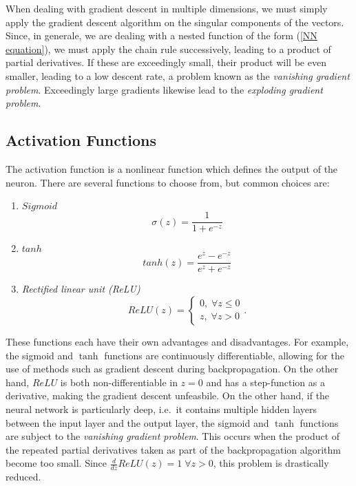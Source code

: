 \documentclass[10pt,a4paper]{book}
\begin{document}
When dealing with gradient descent in multiple dimensions, we must simply apply the gradient descent algorithm on the singular components of the vectors. Since, in generale, we are dealing with a nested function of the form (\ref{NN equation}), we must apply the chain rule successively, leading to a product of partial derivatives. If these are exceedingly small, their product will be even smaller, leading to a low descent rate, a problem known as the \emph{vanishing gradient problem}. Exceedingly large gradients likewise lead to the \emph{exploding gradient problem}. 

\subsection{Activation Functions}
The activation function is a nonlinear function which defines the output of the neuron. There are several functions to choose from, but common choices are:
\begin{enumerate}
\item $Sigmoid$
\begin{equation*}
\sigma(z) = \frac{1}{1 + e^{-z}}
\end{equation*}
\item $tanh$
\begin{equation*}
tanh(z) = \frac{e^z - e^{-z}}{e^z + e^{-z}}
\end{equation*}
\item \emph{Rectified linear unit (ReLU)}
\begin{equation*}
ReLU(z) = \begin{cases}
0, \; \forall z \leq 0 \\
z, \; \forall z > 0
\end{cases}.
\end{equation*}
\end{enumerate} 
These functions each have their own advantages and disadvantages. For example, the sigmoid and $\tanh$ functions are continuously differentiable, allowing for the use of methods such as gradient descent during backpropagation. On the other hand, $ReLU$ is both non-differentiable in $z = 0$ and has a step-function as a derivative, making the gradient descent unfeasbile. On the other hand, if the neural network is particularly deep, i.e.\ it contains multiple hidden layers between the input layer and the output layer, the sigmoid and $\tanh$ functions are subject to the \emph{vanishing gradient problem}. This occurs when the product of the repeated partial derivatives taken as part of the backpropagation algorithm become too small. Since $\frac{d}{dz}ReLU(z) = 1 \; \forall z > 0$, this problem is drastically reduced.
\end{document}
